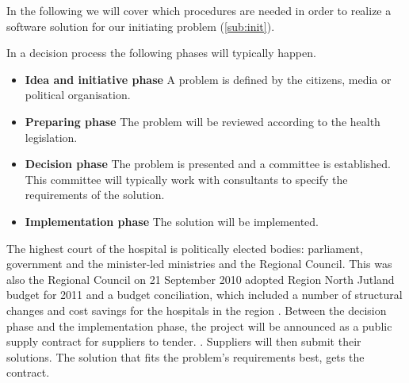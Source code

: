 In the following we will cover which procedures are needed in order to realize a software solution for our initiating problem (\cref{sub:init}).

In a decision process the following phases will typically happen. \cite{Sjaelland}


\begin{itemize}
  \setlength{\itemsep}{1pt}
  \setlength{\parskip}{0pt}
  \setlength{\parsep}{0pt}
	\item \textbf{Idea and initiative phase} A problem is defined by the citizens, media or political organisation.
	\item \textbf{Preparing phase} The problem will be reviewed according to the health legislation.
	\item \textbf{Decision phase} The problem is presented and a committee is established. This committee will typically work with consultants to specify the requirements of the solution.
	\item \textbf{Implementation phase} The solution will be implemented. 
\end{itemize}

The highest court of the hospital is politically elected bodies: parliament, government and the minister-led ministries and the Regional Council. This was also the Regional Council on 21 September 2010 adopted Region North Jutland budget for 2011 and a budget conciliation, which included a number of structural changes and cost savings for the hospitals in the region \cite{politisk_styret_ca}. Between the decision phase and the implementation phase, the project will be announced as a public supply contract for suppliers to tender. \cite{Union2004}. Suppliers will then submit their solutions. The solution that fits the problem's requirements best, gets the contract. 

